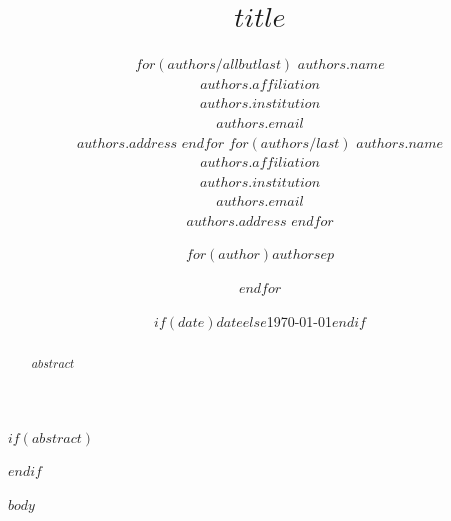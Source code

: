 \documentclass{article}
\title{$title$}
\author{%
$for(authors/allbutlast)$
  $authors.name$\\$authors.affiliation$\\$authors.institution$\\$authors.email$\\$authors.address$ \And
$endfor$
$for(authors/last)$
  $authors.name$\\$authors.affiliation$\\$authors.institution$\\$authors.email$\\$authors.address$
$endfor$
}
\author{$for(author)$$author$$sep$ \and $endfor$}
\date{$if(date)$$date$$else$\today$endif$}
\begin{document}
\maketitle


$if(abstract)$
\begin{abstract}
  $abstract$
\end{abstract}
$endif$


$body$

\end{document}
